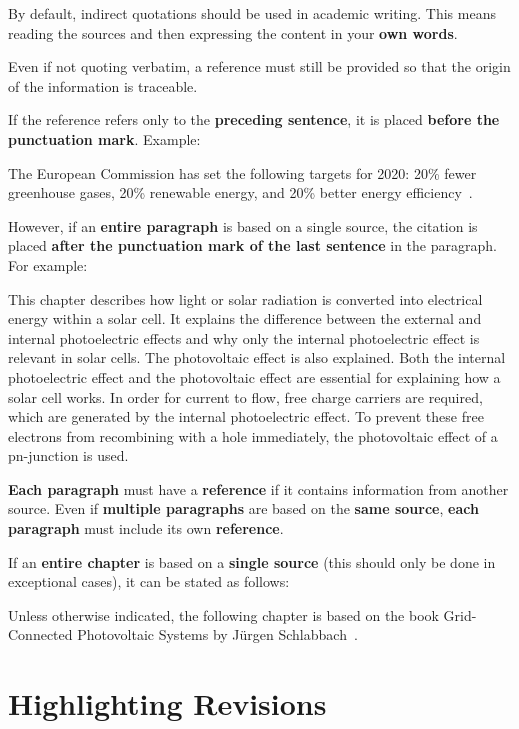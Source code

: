 \documentclass[a4paper, fleqn, headsepline, footsepline, 12pt, parskip=half]{scrartcl}
\begin{document}
By default, indirect quotations should be used in academic writing. This means reading the sources and then expressing the content in your \textbf{own words}.

Even if not quoting verbatim, a reference must still be provided so that the origin of the information is traceable.

If the reference refers only to the \textbf{preceding sentence}, it is placed \textbf{before the punctuation mark}. Example:

The European Commission has set the following targets for 2020: 20\% fewer greenhouse gases, 20\% renewable energy, and 20\% better energy efficiency~\cite{EC2008}.

However, if an \textbf{entire paragraph} is based on a single source, the citation is placed \textbf{after the punctuation mark of the last sentence} in the paragraph. For example:

This chapter describes how light or solar radiation is converted into electrical energy within a solar cell. It explains the difference between the external and internal photoelectric effects and why only the internal photoelectric effect is relevant in solar cells. The photovoltaic effect is also explained. Both the internal photoelectric effect and the photovoltaic effect are essential for explaining how a solar cell works. In order for current to flow, free charge carriers are required, which are generated by the internal photoelectric effect. To prevent these free electrons from recombining with a hole immediately, the photovoltaic effect of a pn-junction is used.~\cite{Finke2012}

\textbf{Each paragraph} must have a \textbf{reference} if it contains information from another source. Even if \textbf{multiple paragraphs} are based on the \textbf{same source}, \textbf{each paragraph} must include its own \textbf{reference}.

If an \textbf{entire chapter} is based on a \textbf{single source} (this should only be done in exceptional cases), it can be stated as follows:

Unless otherwise indicated, the following chapter is based on the book {\glqq}Grid-Connected Photovoltaic Systems{\grqq} by Jürgen Schlabbach~\cite{Schlabbach2011}.


\newpage
\section{Highlighting Revisions}
\label{sec:revisionsAfterCorrection}
\end{document}

